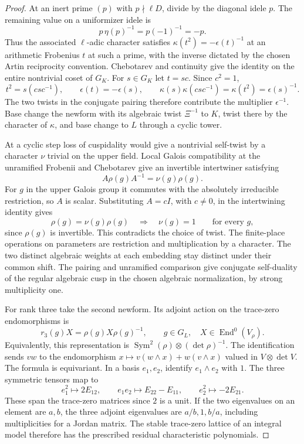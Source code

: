 \begin{proof}
At an inert prime \((p)\) with \(p\nmid\ell D\), divide by the diagonal idele \(p\). The remaining value on a uniformizer idele is
\[
 p\,\eta(p)^{-1}=p(-1)^{-1}=-p .
\]
Thus the associated \(\ell\)-adic character satisfies
\(\kappa(t^2)=-\epsilon(t)^{-1}\) at an arithmetic Frobenius
\(t\) at such a prime, with the inverse dictated by the chosen Artin reciprocity convention. Chebotarev and continuity give the identity on
the entire nontrivial coset of \(G_K\). For \(s\in G_K\) let \(t=sc\). Since \(c^2=1\),
\[
 t^2=s(csc^{-1}),\qquad
 \epsilon(t)=-\epsilon(s),\qquad
 \kappa(s)\kappa(csc^{-1})=\kappa(t^2)=\epsilon(s)^{-1}.
\]
The two twists in the conjugate pairing therefore contribute
the multiplier \(\epsilon^{-1}\).
Base change the newform with its
algebraic twist \(\Xi^{-1}\) to \(K\), twist there by the character
of \(\kappa\), and base change to \(L\) through a cyclic tower.

At a cyclic step loss of cuspidality would give a nontrivial
self-twist by a character \(\nu\) trivial on the upper field.
Local Galois compatibility at the unramified Frobenii and
Chebotarev give an invertible intertwiner satisfying
\[
       A\rho(g)A^{-1}=\nu(g)\rho(g).
\]
For \(g\) in the upper Galois group it commutes with the
absolutely irreducible restriction, so \(A\) is scalar. Substituting \(A=cI\), with \(c\ne0\), in the intertwining identity gives 
\[
 \rho(g)=\nu(g)\rho(g)\quad\Longrightarrow\quad\nu(g)=1\qquad\text{for every }g,
\]
 since \(\rho(g)\) is invertible. This contradicts the choice of twist. The finite-place operations on
parameters are restriction and multiplication by a character.
The two distinct algebraic weights at each embedding stay distinct
under their common shift. The pairing and unramified comparison
give conjugate self-duality of the regular algebraic cusp in the chosen algebraic normalization, by strong multiplicity one.
\cite{arthur-clozel,clozel-rajan}

For rank three take the second newform. Its adjoint action on the trace-zero endomorphisms is
\[
 r_3(g)X=\rho(g)X\rho(g)^{-1},\qquad g\in G_L,\quad X\in\operatorname{End}^0(V_\rho).
\] Equivalently, this representation is \(\operatorname{Sym}^2(\rho)\otimes(\det\rho)^{-1}\). The identification
sends \(vw\) to the endomorphism
\(x\mapsto v(w\wedge x)+w(v\wedge x)\) valued in
\(V\otimes\det V\). The formula is equivariant. In a basis \(e_1,e_2\), identify
\(e_1\wedge e_2\) with \(1\). The three symmetric tensors map to
\[
 e_1^2\longmapsto 2E_{12},\qquad
 e_1e_2\longmapsto E_{22}-E_{11},\qquad
 e_2^2\longmapsto-2E_{21}.
\]
These span the trace-zero matrices since \(2\) is a unit. If the two eigenvalues on an element
are \(a,b\), the three adjoint eigenvalues are \(a/b,1,b/a\),
including multiplicities for a Jordan matrix. The stable
trace-zero lattice of an integral model therefore has the
prescribed residual characteristic polynomials.


\end{proof}
